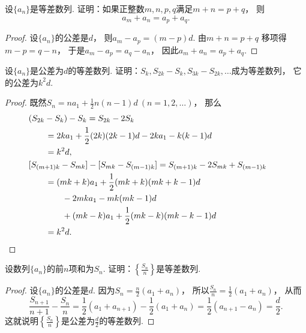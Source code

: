 \begin{example}
设\(\{a_n\}\)是等差数列.
证明：如果正整数\(m,n,p,q\)满足\(m+n=p+q\)，
则\begin{equation*}
	a_m+a_n=a_p+a_q.
\end{equation*}
\begin{proof}
设\(\{a_n\}\)的公差是\(d\)，
则\(a_m-a_p = (m-p)d\).
由\(m+n=p+q\)
移项得\(m-p=q-n\)，
于是\(a_m-a_p = a_q-a_n\)，
因此\(a_m+a_n=a_p+a_q\).
\end{proof}
\end{example}

\begin{example}
设\(\{a_n\}\)是公差为\(d\)的等差数列.
证明：\(S_k,S_{2k}-S_k,S_{3k}-S_{2k},\dotsc\)成为等差数列，
它的公差为\(k^2 d\).
\begin{proof}
既然\(S_n = n a_1 + \frac12 n(n-1) d\ (n=1,2,\dotsc)\)，
那么\begin{align*}
	&\hspace{-20pt}
	(S_{2k}-S_k) - S_k
	= S_{2k} - 2 S_k \\
	&= 2k a_1 + \frac12 (2k)(2k-1) d
	- 2 k a_1 - k(k-1) d \\
	&= k^2 d, \\
	&\hspace{-20pt}
	[S_{(m+1)k}-S_{mk}] - [S_{mk}-S_{(m-1)k}]
	= S_{(m+1)k} - 2 S_{mk} + S_{(m-1)k} \\
	&= (mk+k) a_1 + \frac12 (mk+k)(mk+k-1) d \\
	&\hspace{20pt}
	- 2 mk a_1 - mk (mk-1) d \\
	&\hspace{20pt}
	+ (mk-k) a_1 + \frac12 (mk-k)(mk-k-1) d \\
	&= k^2 d.
	\qedhere
\end{align*}
\end{proof}
\end{example}

\begin{example}
设数列\(\{a_n\}\)的前\(n\)项和为\(S_n\).
证明：\(\left\{\frac{S_n}{n}\right\}\)是等差数列.
\begin{proof}
设\(\{a_n\}\)的公差是\(d\).
因为\(S_n=\frac{n}2(a_1+a_n)\)，
所以\(\frac{S_n}{n}=\frac12(a_1+a_n)\)，
从而\begin{equation*}
	\frac{S_{n+1}}{n+1}-\frac{S_n}{n}
	= \frac12(a_1+a_{n+1})-\frac12(a_1+a_n)
	= \frac12(a_{n+1}-a_n)
	= \frac{d}2.
\end{equation*}
这就说明\(\left\{\frac{S_n}{n}\right\}\)是公差为\(\frac{d}2\)的等差数列.
\end{proof}
\end{example}

